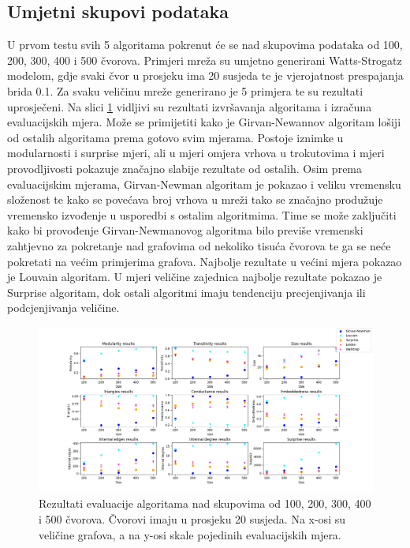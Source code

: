 \subsection{Umjetni skupovi podataka}
U prvom testu svih 5 algoritama pokrenut će se nad skupovima podataka od 100, 200, 300, 400 i 500 čvorova. Primjeri mreža su umjetno generirani Watts-Strogatz modelom, gdje svaki čvor u prosjeku ima 20 susjeda te je vjerojatnost prespajanja brida 0.1. Za svaku veličinu mreže generirano je 5 primjera te su rezultati uprosječeni. Na slici \ref{fig:test1} vidljivi su rezultati izvršavanja algoritama i izračuna evaluacijskih mjera. Može se primijetiti kako je Girvan-Newannov algoritam lošiji od ostalih algoritama prema gotovo svim mjerama. Postoje iznimke u modularnosti i surprise mjeri, ali u mjeri omjera vrhova u trokutovima i  mjeri provodljivosti pokazuje značajno slabije rezultate od ostalih. Osim prema evaluacijskim mjerama, Girvan-Newman algoritam je pokazao i veliku vremensku složenost te kako se povećava broj vrhova u mreži tako se značajno produžuje vremensko izvođenje u usporedbi s ostalim algoritmima. Time se može zaključiti kako bi provođenje Girvan-Newmanovog algoritma bilo previše vremenski zahtjevno za pokretanje nad grafovima od nekoliko tisuća čvorova te ga se neće pokretati na većim primjerima grafova. Najbolje rezultate u većini mjera pokazao je Louvain algoritam. U mjeri veličine zajednica najbolje rezultate pokazao je Surprise algoritam, dok ostali algoritmi imaju tendenciju precjenjivanja ili podcjenjivanja veličine.

\begin{figure}
	\includegraphics[width=\linewidth]{images/test1.png}
	\caption{Rezultati evaluacije algoritama nad skupovima od 100, 200, 300, 400 i 500 čvorova. Čvorovi imaju u prosjeku 20 susjeda. Na x-osi su veličine grafova, a na y-osi skale pojedinih evaluacijskih mjera.}
	\label{fig:test1}
\end{figure}


